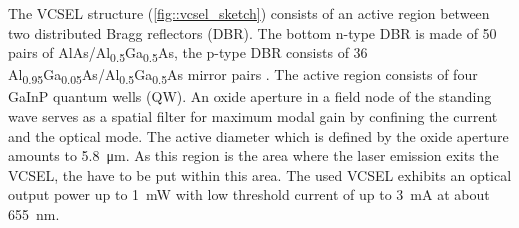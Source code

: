 	The VCSEL structure (\cref{fig::vcsel_sketch}) consists of an active region between two distributed Bragg reflectors (DBR). 
	The bottom n-type DBR is made of 50 pairs of AlAs/Al\textsubscript{0.5}Ga\textsubscript{0.5}As, the p-type DBR consists of 36 Al\textsubscript{0.95}Ga\textsubscript{0.05}As/Al\textsubscript{0.5}Ga\textsubscript{0.5}As mirror pairs \cite{Weidenfeld2012}. 
	The active region consists of four GaInP quantum wells (QW). 
	An oxide aperture in a field node of the standing wave serves as a spatial filter for maximum modal gain by confining the current and the optical mode.
	The active diameter which is defined by the oxide aperture amounts to \SI{5.8}{\micro\meter}.
	As this region is the area where the laser emission exits the VCSEL, the \nds have to be put within this area.
	The used VCSEL exhibits an optical output power up to \SI{1}{\milli\watt} with low threshold current of up to \SI{3}{\milli\ampere} at about \SI{655}{nm}. 

